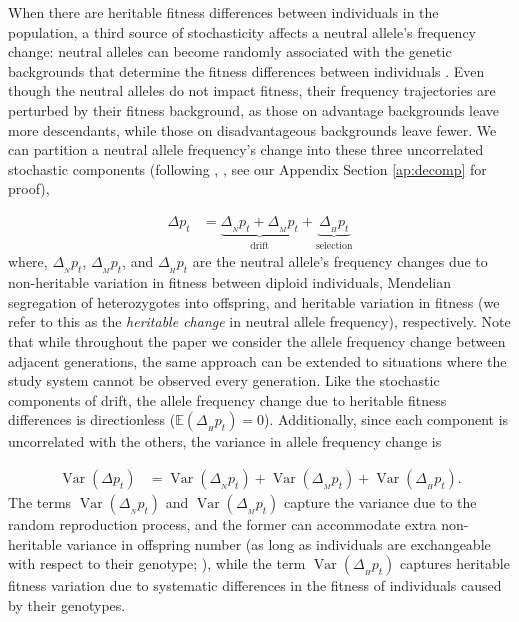 \documentclass[11pt]{article}
\newcommand{\E}{\mathbb{E}}
\DeclareMathOperator{\var}{Var}
\begin{document}
When there are heritable fitness differences between individuals in the
population, a third source of stochasticity affects a neutral allele's
frequency change: neutral alleles can become randomly associated with the
genetic backgrounds that determine the fitness differences between individuals
\parencite{Robertson1961-ho,Santiago1995-hx,Santiago1998-bs}. Even though the
neutral alleles do not impact fitness, their frequency trajectories are
perturbed by their fitness background, as those on advantage backgrounds leave
more descendants, while those on disadvantageous backgrounds leave fewer. We
can partition a neutral allele frequency's change into these three uncorrelated
stochastic components (following \citeauthor{Santiago1995-hx},
\citeyear{Santiago1995-hx}, see our Appendix Section \ref{ap:decomp} for
proof),

\begin{align}
  \Delta p_t %
  &= \underbrace{\Delta_{_N} p_t + \Delta_{_M} p_t}_\text{drift} + \underbrace{\Delta_{_H} p_t}_\text{selection}
  \label{eq:delp-decomp}
\end{align}
%
where, $\Delta_{_N} p_t$, $\Delta_{_M} p_t$, and $\Delta_{_H} p_t$ are the
neutral allele's frequency changes due to non-heritable variation in fitness
between diploid individuals, Mendelian segregation of heterozygotes into
offspring, and heritable variation in fitness (we refer to this as the
\emph{heritable change} in neutral allele frequency), respectively. Note that 
  while throughout the paper we consider the allele frequency change between
  adjacent generations, the same approach can be extended to situations where
the study system cannot be observed every generation. Like the stochastic
components of drift, the allele frequency change due to heritable fitness
differences is directionless ($\E(\Delta_{_H} p_t) = 0$).
Additionally, since each component is uncorrelated with the others, the
variance in allele frequency change is

\begin{align}
  \var(\Delta p_t) &= \var(\Delta_{_N} p_t)  + \var(\Delta_{_M} p_t) + \var(\Delta_{_H} p_t).
  \label{eq:var-decomp-1}
\end{align}
%
The terms $\var(\Delta_{_N} p_t)$ and $\var(\Delta_{_M} p_t)$ capture the
variance due to the random reproduction process, and the former can accommodate
extra non-heritable variance in offspring number (as long as individuals are
exchangeable with respect to their genotype; \cite{Cannings1974-ps}), while the
term $\var(\Delta_{_H} p_t)$ captures heritable fitness variation due to
systematic differences in the fitness of individuals caused by their genotypes.
\end{document}
